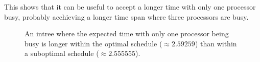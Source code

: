This shows that it can be useful to accept a longer time with only one processor busy, probably acchieving a longer time span where three processors are busy.

\begin{figure}[ht]
  \centering
  
  \caption{An intree where the expected time with only one processor being busy is longer within the optimal schedule ($\approx 2.59259$) than within a suboptimal schedule ($\approx 2.555555$). }
  \label{fig:p3-p1s-suboptimal-example}
\end{figure}

